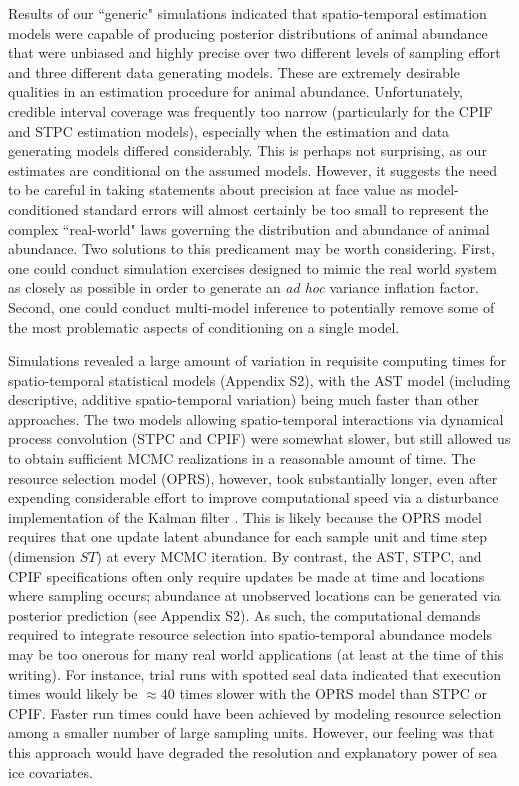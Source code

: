 \documentclass[12pt,english]{article}
\begin{document}
\begin{spacing}{1.9}
Results of our ``generic" simulations indicated that spatio-temporal estimation models were capable of producing posterior distributions of animal abundance that were unbiased and highly precise over two different levels of sampling effort and three different data generating models.  These are extremely desirable qualities in an estimation procedure for animal abundance. Unfortunately, credible interval coverage was frequently too narrow (particularly for the CPIF and STPC estimation models), especially when the estimation and data generating models differed considerably.  This is perhaps not surprising, as our estimates are conditional on the assumed models.  However, it suggests the need to be careful in taking statements about precision at face value as model-conditioned standard errors will almost certainly be too small to represent the complex ``real-world" laws governing the distribution and abundance of animal abundance.  Two solutions to this predicament may be worth considering.  First, one could conduct simulation exercises designed to mimic the real world system as closely as possible in order to generate an {\it ad hoc} variance inflation factor.  Second, one could conduct multi-model inference \citep[e.g., using Bayesian model averaging;][]{HoetingEtAl1999,HootenHobbs2014} to potentially remove some of the most problematic aspects of conditioning on a single model.

Simulations revealed a large amount of variation in requisite computing times for spatio-temporal statistical models (Appendix S2), with the AST model (including descriptive, additive spatio-temporal variation) being much faster than other approaches.  The two models allowing spatio-temporal interactions via dynamical process convolution (STPC and CPIF) were somewhat slower, but still allowed us to obtain sufficient MCMC realizations in a reasonable amount of time.  The resource selection model (OPRS), however, took substantially longer, even after expending considerable effort to improve computational speed via a disturbance implementation of the Kalman filter \citep[][see Appendix S2]{DurbinKoopman2002}.  This is likely because the OPRS model requires that one update latent abundance for each sample unit and time step (dimension $ST$) at every MCMC iteration.  By contrast, the AST, STPC, and CPIF specifications often only require updates be made at time and locations where sampling occurs; abundance at unobserved locations can be generated via posterior prediction (see Appendix S2).  As such, the computational demands required to integrate resource selection into spatio-temporal abundance models may be too onerous for many real world applications (at least at the time of this writing). For instance, trial runs with spotted seal data indicated that execution times would likely be $\approx 40$ times slower with the OPRS model than STPC or CPIF.  Faster run times could have been achieved by modeling resource selection among a smaller number of large sampling units.  However, our feeling was that this approach would have degraded the resolution and explanatory power of sea ice covariates.


\end{spacing}
\end{document}
